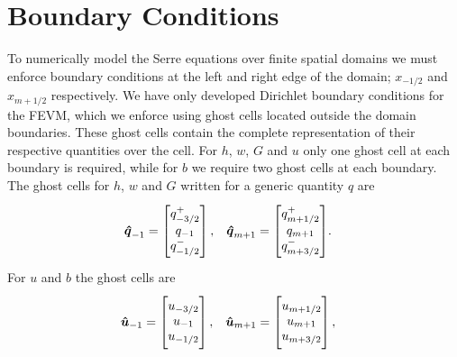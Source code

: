 \section{Boundary Conditions}
To numerically model the Serre equations over finite spatial domains we must enforce boundary conditions at the left and right edge of the domain; $x_{-1/2}$ and $x_{m+1/2}$ respectively. We have only developed Dirichlet boundary conditions for the FEVM, which we enforce using ghost cells located outside the domain boundaries. These ghost cells contain the complete representation of their respective quantities over the cell. For $h$, $w$, $G$ and $u$ only one ghost cell at each boundary is required, while for $b$ we require two ghost cells at each boundary. The ghost cells for $h$, $w$ and $G$ written for a generic quantity $q$ are
\begin{align*}
&\vecn{\hat{q}}_{-1} = \begin{bmatrix} \TM
q^+_{-3/2} \\ q_{-1} \\ q^-_{-1/2} \BM \end{bmatrix},&\vecn{\hat{q}}_{m+1} = \begin{bmatrix} \TM
q^+_{m+1/2} \\ q_{m+1} \\q^-_{m+3/2} \BM\end{bmatrix}&.
\end{align*}
For $u$ and $b$ the ghost cells are
\begin{align*}
&\vecn{\hat{u}}_{-1} = \begin{bmatrix}\TM
u_{-3/2} \\ u_{-1} \\ u_{-1/2} \BM\end{bmatrix},&\vecn{\hat{u}}_{m+1} = \begin{bmatrix}\TM
u_{m+1/2} \\ u_{m+1} \\ u_{m+3/2} \BM\end{bmatrix},&
\end{align*}
